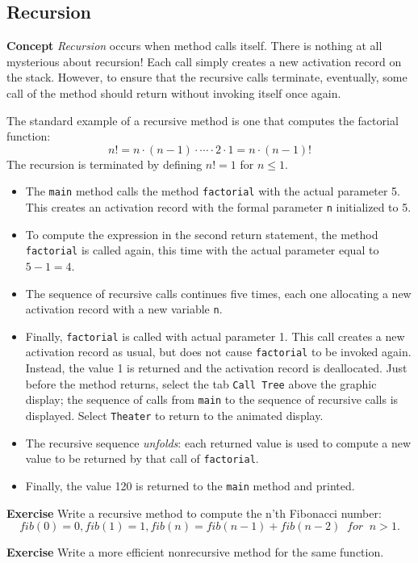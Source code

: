 \subsection{Recursion}\label{method.04}

\textbf{Concept} \emph{Recursion} occurs when method calls itself.
There is nothing at all mysterious about recursion!
Each call simply creates a new activation record on the stack.
However, to ensure that the recursive calls terminate,
eventually, some call of the method should return without
invoking itself once again.


The standard example of a recursive method is one
that computes the factorial function:
\begin{displaymath}
n! = n\cdot{} (n-1) \cdot{} \cdots{} \cdot{} 2 \cdot{} 1 = n \cdot{} (n-1)!
\end{displaymath}
The recursion is terminated by defining $n!=1$ for $n\leq 1$.

\begin{itemize}
\item The \texttt{main} method calls the method \texttt{factorial}
with the actual parameter 5. This creates an activation record with
the formal parameter \texttt{n} initialized to 5.
\item To compute the expression in the second return statement,
the method \texttt{factorial} is called again, this time with the actual
parameter equal to $5-1=4$.
\item The sequence of recursive calls continues five times,
each one allocating a new activation record with a new variable \texttt{n}.
\item Finally, \texttt{factorial} is called with actual parameter 1.
This call creates a new activation record as usual, but does not
cause \texttt{factorial} to be invoked again. Instead,
the value 1 is returned and the activation record is deallocated.
Just before the method returns, select the tab \texttt{Call Tree} above the graphic display;
the sequence of calls from \texttt{main} to the sequence of recursive calls is displayed.
Select \texttt{Theater} to return to the animated display.
\item The recursive sequence \emph{unfolds}: each returned value
is used to compute a new value to be returned by that call of \texttt{factorial}.
\item Finally, the value 120 is returned to the \texttt{main} method and printed.
\end{itemize}

\textbf{Exercise} Write a recursive method to compute the n'th Fibonacci number: 
\begin{displaymath}
fib(0) = 0, fib(1) = 1, fib(n) = fib(n-1) + fib(n-2) \;\;\mathit{for}\;\; n > 1.	
\end{displaymath}


\textbf{Exercise} Write a more efficient nonrecursive method for the same function.
